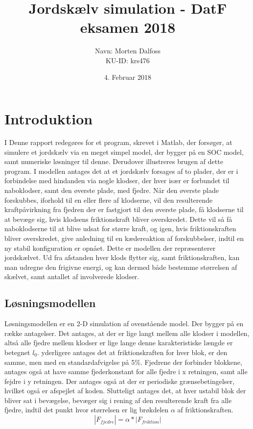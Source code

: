 \documentclass[12pt]{article}
\title{Jordskælv simulation - DatF eksamen 2018}
\date{4. Februar 2018}
\author{
		Navn: Morten Dalfoss \\
		KU-ID: krs476 \\ }
\begin{document}
\graphicspath{ {F:/Uni/DatF/datfeksamen/Morten} }

\maketitle
\tableofcontents
\newpage

\section{Introduktion}
I Denne rapport redegøres for et program, skrevet i Matlab, der forsøger, at simulere et jordskælv via en meget simpel model, der bygger på en SOC model, samt numeriske løsninger til denne. Derudover illustreres brugen af dette program.
I modellen antages det at et jordskælv forsages af to plader, der er i forbindelse med hindanden via nogle klodser, der hver især er forbundet til naboklodser, samt den øverste plade, med fjedre. Når den øverste plade forskubbes, iforhold til en eller flere af klodserne, vil den resulterende kraftpåvirkning fra fjedren der er fastgjort til den øverste plade, få klodserne til at bevæge sig, hvis klodsens friktionskraft bliver overskredet. Dette vil så få naboklodserne til at blive udsat for større kraft, og igen, hvis friktionskraften bliver overskredet, give anledning til en kædereaktion af forskubbelser, indtil en ny stabil konfiguration er opnået. Dette er modellen der repræsenterer jordskælvet. Ud fra afstanden hver klods flytter sig, samt friktionskraften, kan man udregne den frigivne energi, og kan dermed både bestemme størrelsen af skælvet, samt antallet af involverede klodser.

\subsection{Løsningsmodellen}

Løsningsmodellen er en 2-D simulation af ovenstående model. Der bygger på en række antagelser. Det antages, at der er lige langt mellem alle klodser i modellen, altså alle fjedre mellem klodser er lige lange denne karakteristiske længde er betegnet $l_0$. yderligere antages det at friktionskraften for hver blok, er den samme, men med en standardafvigelse på 5\%. Fjedrene der forbinder blokkene, antages også at have samme fjederkonstant for alle fjedre i x retningen, samt alle fejdre i y retningen. Der antages også at der er periodiske grænsebetingelser, hvilket også er afspejlet af koden. Slutteligt antages det, at hver ustabil blok der bliver sat i bevægelse, bevæger sig i rening af den resulterende kraft fra alle fjedre, indtil det punkt hvor størrelsen er lig brøkdelen $\alpha$ af friktionskraften.
\begin{equation}
	|F_{fjedre}| = \alpha * |F_{friktion}|
\end{equation}
\end{document}
